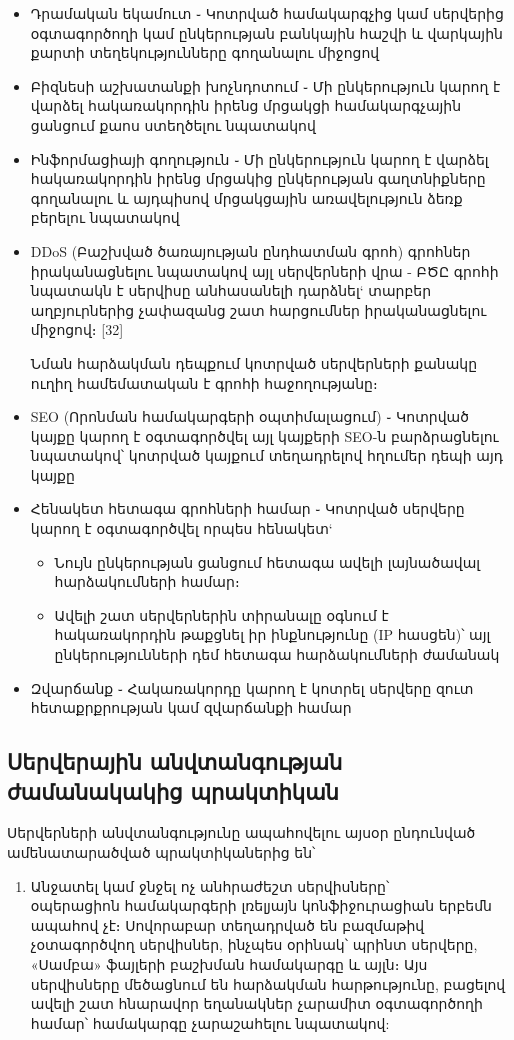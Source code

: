 \documentclass[a4paper,12pt]{article}
\begin{document}
\begin{sloppypar}
\begin{itemize}
\item Դրամական եկամուտ ֊ Կոտրված համակարգչից կամ սերվերից օգտագործողի
    կամ ընկերության բանկային հաշվի և վարկային քարտի տեղեկությունները
    գողանալու միջոցով
\item Բիզնեսի աշխատանքի խոչնդոտում ֊ Մի ընկերություն կարող է վարձել
    հակառակորդին իրենց մրցակցի համակարգչային ցանցում քաոս ստեղծելու
    նպատակով
\item Ինֆորմացիայի գողություն ֊ Մի ընկերություն կարող է վարձել
    հակառակորդին իրենց մրցակից ընկերության գաղտնիքները գողանալու և
    այդպիսով մրցակցային առավելություն ձեռք բերելու նպատակով
\item DDoS (Բաշխված ծառայության ընդհատման գրոհ) գրոհներ
    իրականացնելու նպատակով այլ սերվերների վրա - 
	ԲԾԸ գրոհի նպատակն է սերվիսը անհասանելի դարձնել`
	տարբեր աղբյուրներից չափազանց շատ հարցումներ
	իրականացնելու միջոցով։ [32]
	
    Նման հարձակման դեպքում կոտրված սերվերների քանակը
	ուղիղ համեմատական է գրոհի հաջողությանը։
\item SEO (Որոնման համակարգերի օպտիմալացում) ֊ Կոտրված կայքը կարող է
    օգտագործվել այլ կայքերի SEO-ն բարձրացնելու նպատակով՝ կոտրված կայքում
    տեղադրելով հղումեր դեպի այդ կայքը
\item Հենակետ հետագա գրոհների համար ֊ Կոտրված սերվերը կարող է օգտագործվել
	որպես հենակետ`
	\begin{itemize}
	\item Նույն ընկերության ցանցում հետագա ավելի լայնածավալ հարձակումների
		համար։
	\item Ավելի շատ սերվերներին տիրանալը օգնում է հակառակորդին թաքցնել
		իր ինքնությունը (IP հասցեն)՝ այլ ընկերությունների դեմ հետագա
		հարձակումների ժամանակ
	\end{itemize}
\item Զվարճանք ֊ Հակառակորդը կարող է կոտրել սերվերը զուտ հետաքրքրության կամ
    զվարճանքի համար
\end{itemize}


\subsection{Սերվերային անվտանգության ժամանակակից պրակտիկան}


Սերվերների անվտանգությունը ապահովելու այսօր ընդունված ամենատարածված
պրակտիկաներից են՝

\begin{enumerate}
\item Անջատել կամ ջնջել ոչ անհրաժեշտ սերվիսները՝\\
    օպերացիոն համակարգերի լռելյայն կոնֆիջուրացիան երբեմն ապահով չէ։
    Սովորաբար տեղադրված են բազմաթիվ չօտագործվող սերվիսներ, ինչպես
    օրինակ՝ պրինտ սերվերը, «Սամբա» ֆայլերի բաշխման համակարգը և այլն։
	Այս սերվիսները
    մեծացնում են հարձակման հարթությունը, բացելով ավելի շատ հնարավոր եղանակներ
    չարամիտ օգտագործողի համար՝ համակարգը չարաշահելու նպատակով:


\end{enumerate}
\end{sloppypar}
\end{document}
